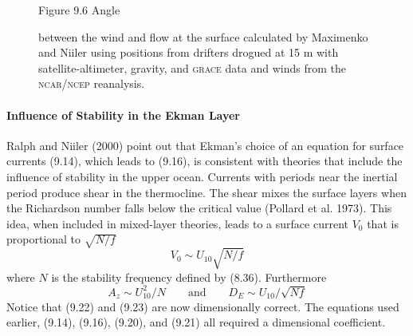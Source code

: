 \begin{figure}[t!]
\footnotesize
Figure 9.6 Angle \rule{0mm}{3ex}between the wind and flow at the
surface calculated by Maximenko and Niiler using positions from
drifters drogued at 15 m with satellite-altimeter, gravity, and
\textsc{grace} data and winds from the \textsc{ncar/ncep}
reanalysis.
\label{fig:ekmanangle}
\vspace{-3ex}
\end{figure}

\paragraph{Influence of Stability in the Ekman Layer}
Ralph and Niiler (2000)
point out that Ekman's choice of an equation for surface currents
(9.14), which leads to (9.16), is consistent with theories that
include the influence of stability in the upper ocean.  Currents with
periods near the inertial period produce shear
in the thermocline. The shear
mixes the surface layers when the Richardson number falls below the
critical value (Pollard et al. 1973). This idea, when included in
mixed-layer theories, leads to a surface current $V_0$ that is
proportional to $\sqrt{N/f}$
\begin{equation}
V_0 \sim U_{10}  \sqrt{N/f}
\end{equation}
where $N$ is the stability frequency defined by (8.36). Furthermore
\begin{equation}
A_z \sim U_{10}^2 / N \qquad \text{and} \qquad D_E \sim U_{10} / \sqrt{Nf}
\end{equation}
Notice that (9.22) and (9.23) are now dimensionally correct. The
equations used earlier, (9.14), (9.16), (9.20), and (9.21) all
required a dimensional coefficient.

